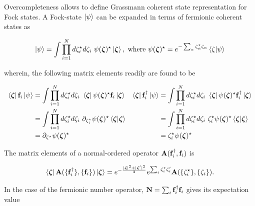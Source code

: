 \documentclass{homework}
\begin{document}
Overcompleteness allows to define Grassmann coherent state representation for Fock states. A Fock-state $\ket{\psi}$ can be expanded in terms of fermionic coherent states as 

$$
\ket{\psi} = \int \prod_{i=1}^{N} d{\zeta}^\star_i d\zeta_i \textnormal{ } \psi({\bm \zeta)^\star} \ket{\bm{\zeta}}, \textnormal{ where } \psi({\bm \zeta)^\star} = e^{- \sum_{\alpha} \zeta^\star_{\alpha} \zeta_\alpha} \bra{\zeta}\ket{\psi} 
$$

wherein, the following matrix elements readily are found to be 

\begin{equation}
\begin{array}{cc}
    \begin{split}
        \bra{\bm{\zeta}} {{\bf f}}_i \ket{\psi} &= \int \prod_{i=1}^{N} d{\zeta}^\star_i d\zeta_i \textnormal{ } \bra{\bm{\zeta}} \psi({\bm \zeta)^\star} {{\bf f}}_i \ket{\bm{\zeta}} \\
        &= \int \prod_{i=1}^{N} d{\zeta}^\star_i d\zeta_i \textnormal{ } \partial_{\zeta_i^\star} \psi({\bm \zeta)^\star} \bra{\bm{\zeta}}\ket{\bm{\zeta}} \\
        &= \partial_{{\zeta^\star}}\psi({\bm \zeta)^\star}
    \end{split} & \begin{split}
         \bra{\bm{\zeta}} {{\bf f}}_i^\dagger \ket{\psi} &= \int \prod_{i=1}^{N} d{\zeta}^\star_i d\zeta_i \textnormal{ } \bra{\bm{\zeta}} \psi({\bm \zeta)^\star} {{\bf f}}_i^\dagger \ket{\bm{\zeta}} \\
        &= \int \prod_{i=1}^{N} d{\zeta}^\star_i d\zeta_i \textnormal{ } {\zeta_i^\star} \psi({\bm \zeta)^\star} \bra{\bm{\zeta}}\ket{\bm{\zeta}} \\
        &= {\zeta_i^\star} \psi({\bm \zeta)^\star}
    \end{split}  \\
   \end{array}  
\end{equation}
   
The matrix elements of a normal-ordered operator ${\bf A}({{{\bf f}}_i^\dagger
}, {{\bf f}}_i)$ is 

$$
\bra{\bm{\zeta}} {{\bf A}}(\{{{\bf f}}_i^\dagger
\}, \{{\bf f}_i\}) \ket{\bm{\zeta}} = e^{-\frac{|\bm{\zeta}|^2 + |\bm{\zeta}'|^2}{2}} e^{\sum_{i} \zeta_i^\star \zeta_i'} {{\bf A}}(\{\zeta_i^\star\}, \{\zeta_i\}).
$$

In the case of the fermionic number operator, ${{\bf N}} = \sum_{i} {{\bf f}}_i^\dagger {{\bf f}}_i$ gives its expectation value 
\end{document}
